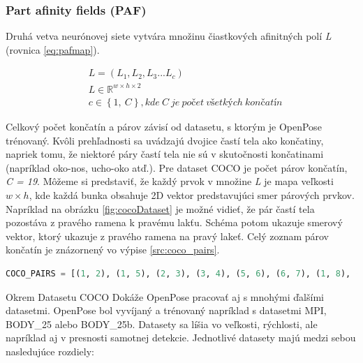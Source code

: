 \documentclass[slovak,master,dept460,male,cpp,cpdeclaration]{diploma}
\begin{document}
\subsubsection{Part afinity fields (PAF)}
Druhá vetva neurónovej siete vytvára množinu čiastkových afinitných polí \textit{L} (rovnica \ref{eq:pafmap}).

\begin{eqnarray}
& L = (L_{1}, L_{2}, L_{3} ... L_{c}) \label{eq:pafmap}\\
& L\in\mathbb{R}^{w \times  h \times 2}\nonumber\\
& c\in \left \{1,\: C  \right \}, kde\: C\: je\: počet\: všetkých\: končatín\nonumber
\end{eqnarray}

Celkový počet končatín a párov závisí od datasetu, s ktorým je OpenPose trénovaný. Kvôli prehľadnosti sa uvádzajú dvojice častí tela ako končatiny, napriek tomu, že niektoré páry častí tela nie sú v skutočnosti končatinami (napríklad oko-nos, ucho-oko atď.). Pre dataset COCO je počet párov končatín, \textit{C = 19}. Môžeme si predstaviť, že každý prvok v množine \textit{L} je mapa veľkosti $w \times h$, kde každá bunka obsahuje 2D vektor predstavujúci smer párových prvkov. Napríklad na obrázku \ref{fig:cocoDataset} je možné vidieť, že pár častí tela pozostáva z pravého ramena k pravému lakťu. Schéma potom ukazuje smerový vektor, ktorý ukazuje z pravého ramena na pravý lakeť. Celý zoznam párov končatín je znázornený vo výpise \ref{src:coco_pairs}.\bigskip

\begin{lstlisting}[language=Python,label=src:coco_pairs,caption={Množina párov končatín v datasete COCO}]
COCO_PAIRS = [(1, 2), (1, 5), (2, 3), (3, 4), (5, 6), (6, 7), (1, 8), (8, 9), (9, 10), (1, 11), (11, 12), (12, 13), (1, 0), (0, 14), (14, 16), (0, 15), (15, 17), (2, 16), (5, 17)]
\end{lstlisting}

\bigskip
Okrem Datasetu COCO Dokáže OpenPose pracovať aj s mnohými ďalšími datasetmi. OpenPose bol vyvíjaný a trénovaný napríklad s datasetmi MPI\cite{andriluka14cvpr}, BODY\_25 alebo BODY\_25b. Datasety sa líšia vo veľkosti, rýchlosti, ale napríklad  aj v presnosti samotnej detekcie. Jednotlivé datasety majú medzi sebou nasledujúce rozdiely:
\end{document}
